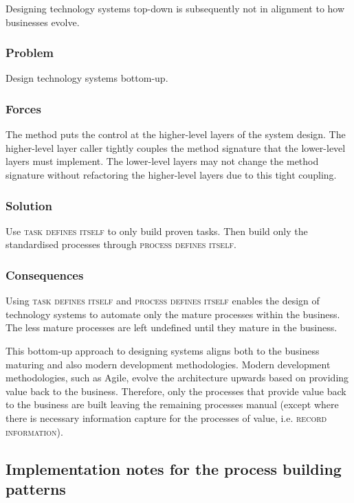 \documentclass[prodmode]{style/acmlarge}
\begin{document}
Designing technology systems top-down is subsequently not in alignment to how
businesses evolve.

\subsubsection*{Problem} Design technology systems bottom-up.

\subsubsection*{Forces} The method puts the control at the higher-level layers
of the system design.  The higher-level layer caller tightly couples the method
signature that the lower-level layers must implement.  The lower-level layers
may not change the method signature without refactoring the higher-level layers
due to this tight coupling.

\subsubsection*{Solution} Use \textsc{task defines itself} to only build proven
tasks.  Then build only the standardised processes through \textsc{process
defines itself}.

\subsubsection*{Consequences} Using \textsc{task defines itself} and
\textsc{process defines itself} enables the design of technology systems to
automate only the mature processes within the business.  The less mature
processes are left undefined until they mature in the business.

This bottom-up approach to designing systems aligns both to the business
maturing and also modern development methodologies.  Modern development
methodologies, such as Agile, evolve the architecture upwards based on providing
value back to the business.  Therefore, only the processes that provide value
back to the business are built leaving the remaining processes manual (except
where there is necessary information capture for the processes of value, i.e.
\textsc{record information}).



\subsection{Implementation notes for the process building patterns}
\end{document}
